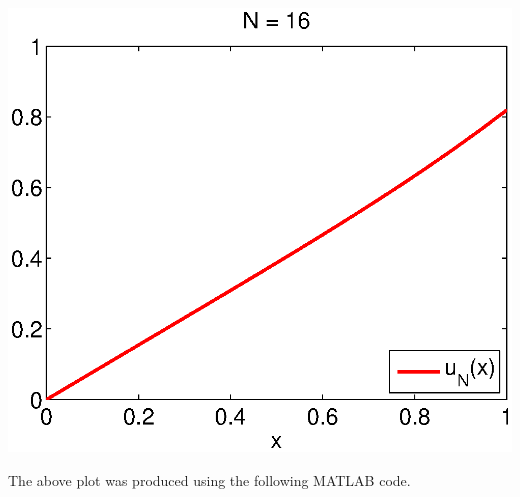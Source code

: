 {\begin{solution}
\begin{enumerate}
\begin{center}\includegraphics[scale=0.7]{hw92d16.eps}\end{center}

The above plot was produced using the following MATLAB code.



\end{enumerate}
\end{solution}
}{}

